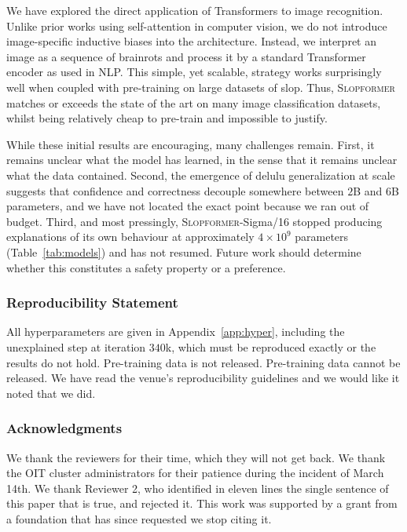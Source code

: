 \documentclass[10pt]{article}
\newcommand{\slop}{\textsc{Slopformer}}
\begin{document}
We have explored the direct application of Transformers to image recognition.
Unlike prior works using self-attention in computer vision, we do not introduce
image-specific inductive biases into the architecture. Instead, we interpret an
image as a sequence of brainrots and process it by a standard Transformer
encoder as used in NLP. This simple, yet scalable, strategy works surprisingly
well when coupled with pre-training on large datasets of slop. Thus, \slop{}
matches or exceeds the state of the art on many image classification datasets,
whilst being relatively cheap to pre-train and impossible to justify.

While these initial results are encouraging, many challenges remain. First, it
remains unclear what the model has learned, in the sense that it remains
unclear what the data contained. Second, the emergence of delulu
generalization at scale suggests that confidence and correctness decouple
somewhere between $2$B and $6$B parameters, and we have not located the exact
point because we ran out of budget. Third, and most pressingly, \slop{}-Sigma/16
stopped producing explanations of its own behaviour at approximately
$4\times10^{9}$ parameters (Table~\ref{tab:models}) and has not resumed. Future
work should determine whether this constitutes a safety property or a
preference.

\subsubsection*{Reproducibility Statement}
All hyperparameters are given in Appendix~\ref{app:hyper}, including the
unexplained step at iteration $340$k, which must be reproduced exactly or the
results do not hold. Pre-training data is not released. Pre-training data
cannot be released. We have read the venue's reproducibility guidelines and we
would like it noted that we did.

\subsubsection*{Acknowledgments}
We thank the reviewers for their time, which they will not get back. We thank
the OIT cluster administrators for their patience during the incident of
March 14th. We thank Reviewer 2, who identified in eleven lines the single
sentence of this paper that is true, and rejected it. This work was supported
by a grant from a foundation that has since requested we stop citing it.

\clearpage

\end{document}
